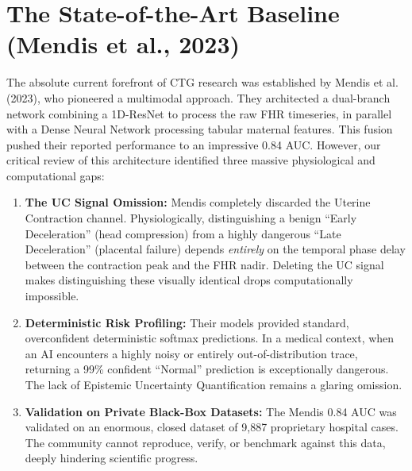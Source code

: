 \documentclass[12pt,a4paper]{report}
\begin{document}
\section{The State-of-the-Art Baseline (Mendis et al., 2023)}
The absolute current forefront of CTG research was established by Mendis et al. (2023), who pioneered a multimodal approach. They architected a dual-branch network combining a 1D-ResNet to process the raw FHR timeseries, in parallel with a Dense Neural Network processing tabular maternal features. This fusion pushed their reported performance to an impressive 0.84 AUC. However, our critical review of this architecture identified three massive physiological and computational gaps:
\begin{enumerate}
    \item \textbf{The UC Signal Omission:} Mendis completely discarded the Uterine Contraction channel. Physiologically, distinguishing a benign ``Early Deceleration'' (head compression) from a highly dangerous ``Late Deceleration'' (placental failure) depends \textit{entirely} on the temporal phase delay between the contraction peak and the FHR nadir. Deleting the UC signal makes distinguishing these visually identical drops computationally impossible.
    \item \textbf{Deterministic Risk Profiling:} Their models provided standard, overconfident deterministic softmax predictions. In a medical context, when an AI encounters a highly noisy or entirely out-of-distribution trace, returning a 99\% confident ``Normal'' prediction is exceptionally dangerous. The lack of Epistemic Uncertainty Quantification remains a glaring omission.
    \item \textbf{Validation on Private Black-Box Datasets:} The Mendis 0.84 AUC was validated on an enormous, closed dataset of 9,887 proprietary hospital cases. The community cannot reproduce, verify, or benchmark against this data, deeply hindering scientific progress.
\end{enumerate}
\end{document}
